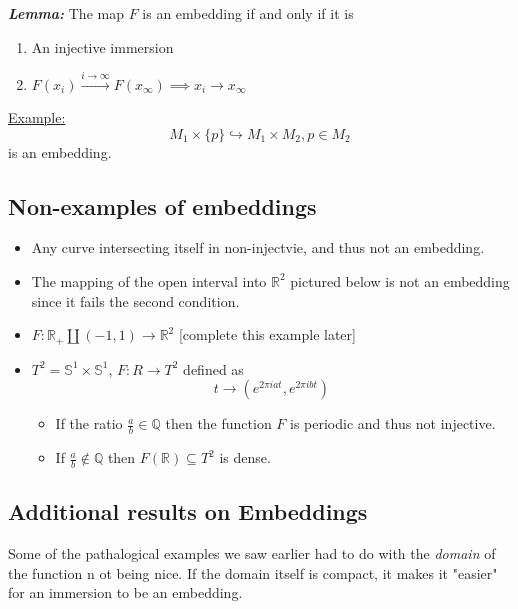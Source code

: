 \documentclass{article}
\newcommand{\R}{\mathbb{R}}
\begin{document}
\begin{dottedbox}
  \emph{\textbf{Lemma:}} The map $F$ is an embedding if and only if it is 
  \begin{enumerate}
    \item An injective immersion 
    \item $F(x_i) \xrightarrow{i \rightarrow \infty} F(x_{\infty}) \implies x_i \rightarrow x_{\infty}$
  \end{enumerate}
\end{dottedbox}
 
\vskip 0.5cm
\underline{Example:} 
\[ M_1 \times \{p\} \hookrightarrow M_1 \times M_2, p \in M_2 \] is an embedding.

\subsection*{Non-examples of embeddings}

\begin{itemize}
  \item Any curve intersecting itself in non-injectvie, and thus not an embedding.
  \item The mapping of the open interval into $\R^2$ pictured below is not an embedding since it fails the second condition.
  \item $F : \R_{+} \coprod (-1, 1) \rightarrow \R^2$ [complete this example later]
  \item $T^2 = \mathbb{S}^1 \times \mathbb{S}^1$, $F : R \rightarrow T^2$ defined as 
  \[ t \rightarrow \left( e^{2\pi i a t}, e^{2\pi i b t} \right) \]
  \begin{itemize}
    \item If the ratio $\frac{a}{b} \in \mathbb{Q}$ then the function $F$ is periodic and thus not injective.
  
    \vskip 0.5cm
    \item If $\frac{a}{b} \not\in \mathbb{Q}$ then $F(\R) \subseteq T^2$ is dense.
  \end{itemize}
  \end{itemize}

\vskip 0.5cm
\subsection*{Additional results on Embeddings}

Some of the pathalogical examples we saw earlier had to do with the \emph{domain} of the function n ot being nice. If the domain itself is compact, it makes it "easier" for an immersion to be an embedding.
\end{document}
